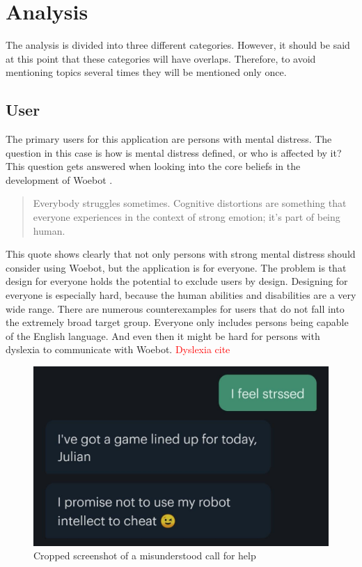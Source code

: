 \section{Analysis}\label{sec:analysis}
The analysis is divided into three different categories.
However, it should be said at this point that these categories will have overlaps.
Therefore, to avoid mentioning topics several times they will be mentioned only once.

\subsection{User}
The primary users for this application are persons with mental distress.
The question in this case is how is mental distress defined, or who is affected by it?
This question gets answered when looking into the core beliefs in the development of Woebot \cite{woebot-beliefs}.

\begin{quote}
    Everybody struggles sometimes. Cognitive distortions are something that everyone experiences in the context of strong emotion; it's part of being human.
\end{quote}

This quote shows clearly that not only persons with strong mental distress should consider using Woebot, but the application is for everyone.
The problem is that design for everyone holds the potential to exclude users by design\cite{feminist-technology}.
Designing for everyone is especially hard, because the human abilities and disabilities are a very wide range.
There are numerous counterexamples for users that do not fall into the extremely broad target group.
Everyone only includes persons being capable of the English language.
And even then it might be hard for persons with dyslexia to communicate with Woebot.\textcolor{red}{ Dyslexia cite}\\

\begin{figure}[ht]
    \begin{center}
        \includegraphics[width=1\columnwidth]{files/dyslexia.png}
        \caption{\label{fig:dyslexia} Cropped screenshot of a misunderstood call for help}
    \end{center}
\end{figure}

